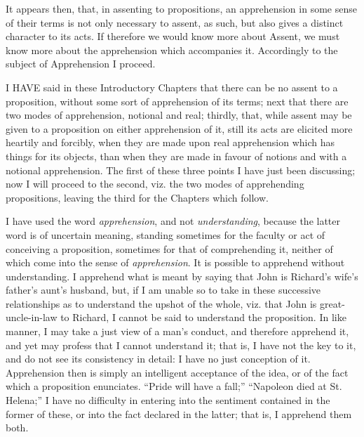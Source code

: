 It appears then, that, in assenting to propositions, an
apprehension in some sense of their terms is not only necessary to
assent, as such, but also gives a distinct character to its acts. If
therefore we would know more about Assent, we must know more about the
apprehension which accompanies it. Accordingly to the subject of
Apprehension I proceed.


I HAVE said in these Introductory Chapters that there can be
no assent to a proposition, without some sort of apprehension of its
terms; next that there are two modes of apprehension, notional and
real; thirdly, that, while assent may be given to a proposition on
either apprehension of it, still its acts are elicited more heartily
and forcibly, when they are made upon real apprehension which has
things for its objects, than when they are made in favour of notions
and with a notional apprehension. The first of these three points I
have just been discussing; now I will proceed to the second, viz. the
two modes of apprehending propositions, leaving the third for the
Chapters which follow.

I have used the word \emph{apprehension}, and not \emph{understanding},
because the latter word is of uncertain meaning, standing sometimes
for the faculty or act of conceiving a proposition, sometimes for that
of comprehending it, neither of which come into the sense of \emph{apprehension}.
It is possible to apprehend without understanding. I apprehend what is
meant by saying that John is Richard's wife's father's aunt's husband,
but, if I am unable so to take in these successive relationships
as to understand the upshot of the whole, viz. that John is
great-uncle-in-law to Richard, I cannot be said to understand the
proposition. In like manner, I may take a just view of a man's
conduct, and therefore apprehend it, and yet may profess that I cannot
understand it; that is, I have not the key to it, and do not see its
consistency in detail: I have no just conception of it. Apprehension
then is simply an intelligent acceptance of the idea, or of the fact
which a proposition enunciates. ``Pride will have a fall;''
``Napoleon died at St. Helena;'' I have no difficulty in
entering into the sentiment contained in the former of these, or into
the fact declared in the latter; that is, I apprehend them both.

